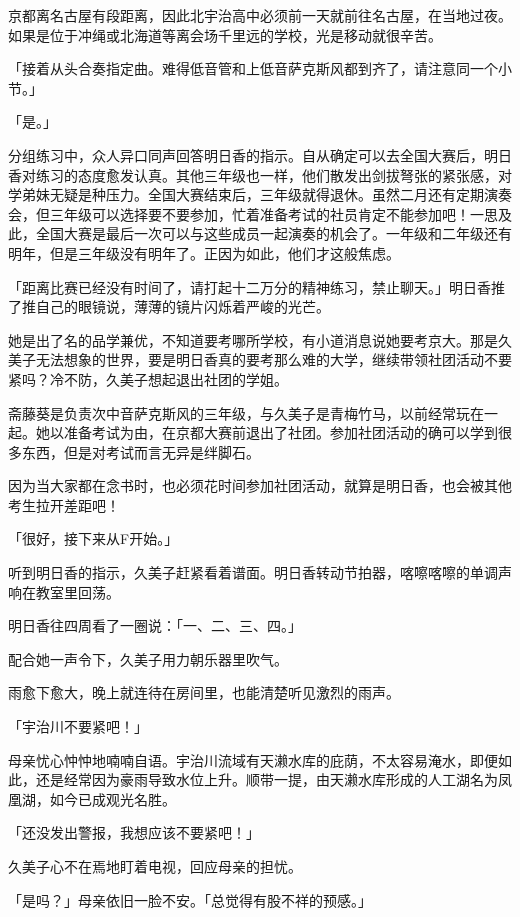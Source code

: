 \documentclass[UTF8]{ctexart}
\begin{document}
    京都离名古屋有段距离，因此北宇治高中必须前一天就前往名古屋，在当地过夜。如果是位于冲绳或北海道等离会场千里远的学校，光是移动就很辛苦。 

    「接着从头合奏指定曲。难得低音管和上低音萨克斯风都到齐了，请注意同一个小节。」 

    「是。」 

    分组练习中，众人异口同声回答明日香的指示。自从确定可以去全国大赛后，明日香对练习的态度愈发认真。其他三年级也一样，他们散发出剑拔弩张的紧张感，对学弟妹无疑是种压力。全国大赛结束后，三年级就得退休。虽然二月还有定期演奏会，但三年级可以选择要不要参加，忙着准备考试的社员肯定不能参加吧！一思及此，全国大赛是最后一次可以与这些成员一起演奏的机会了。一年级和二年级还有明年，但是三年级没有明年了。正因为如此，他们才这般焦虑。 

    「距离比赛已经没有时间了，请打起十二万分的精神练习，禁止聊天。」明日香推了推自己的眼镜说，薄薄的镜片闪烁着严峻的光芒。 

    她是出了名的品学兼优，不知道要考哪所学校，有小道消息说她要考京大。那是久美子无法想象的世界，要是明日香真的要考那么难的大学，继续带领社团活动不要紧吗？冷不防，久美子想起退出社团的学姐。 

    斋藤葵是负责次中音萨克斯风的三年级，与久美子是青梅竹马，以前经常玩在一起。她以准备考试为由，在京都大赛前退出了社团。参加社团活动的确可以学到很多东西，但是对考试而言无异是绊脚石。 

    因为当大家都在念书时，也必须花时间参加社团活动，就算是明日香，也会被其他考生拉开差距吧！ 

    「很好，接下来从F开始。」 

    听到明日香的指示，久美子赶紧看着谱面。明日香转动节拍器，喀嚓喀嚓的单调声响在教室里回荡。 

    明日香往四周看了一圈说：「一、二、三、四。」 

    配合她一声令下，久美子用力朝乐器里吹气。 

    雨愈下愈大，晚上就连待在房间里，也能清楚听见激烈的雨声。 

    「宇治川不要紧吧！」 

    母亲忧心忡忡地喃喃自语。宇治川流域有天濑水库的庇荫，不太容易淹水，即便如此，还是经常因为豪雨导致水位上升。顺带一提，由天濑水库形成的人工湖名为凤凰湖，如今已成观光名胜。 

    「还没发出警报，我想应该不要紧吧！」 

    久美子心不在焉地盯着电视，回应母亲的担忧。 

    「是吗？」母亲依旧一脸不安。「总觉得有股不祥的预感。」 
\end{document}
